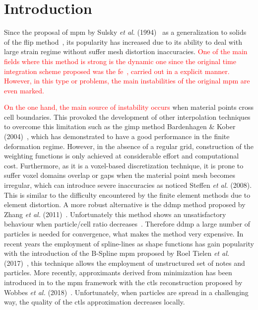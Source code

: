 \documentclass[preprint,12pt,a4paper]{elsarticle}
\newcommand{\PNA}[1]{
  \textcolor{red}{{#1}}
}
\begin{document}
\linenumbers

\section{Introduction}
\label{intro}
Since the proposal of \acrshort{mpm} by Sulsky {\it  et al.}
(1994)~\cite{Sulsky1994} as a generalization to solids of the \acrfull{flip} method~\cite{Brackbill1986}, its popularity
has increased due to its ability to deal with large strain regime
without suffer mesh distortion inaccuracies. \PNA{One of the main fields where this method is strong is the dynamic one since the original time integration scheme proposed was the \acrfull{fe}~\cite{Sulsky1994}, carried out in a explicit manner. However, in this type or problems, the main instabilities of the original \acrshort{mpm} are even marked.}

\PNA{On the one hand, the main source of instability occurs} when
material points cross cell boundaries. This provoked the development
of other interpolation techniques to overcome this limitation such as
the \acrfull{gimp} method Bardenhagen \& Kober (2004)~\cite{Bardenhagen2004}, which has
demonstrated to have a good performance in the finite deformation
regime. However, in the absence of a regular grid, construction of the
weighting functions is only achieved at considerable effort and
computational cost.  Furthermore, as it is a voxel-based
discretization technique, it is prone to suffer voxel domains overlap
or gaps when the material point mesh becomes irregular, which can
introduce severe inaccuracies as noticed Steffen {\it et al.}
(2008)\cite{Steffen2008}. This is similar to the difficulty
encountered by the finite element methods due to element distortion.
A more robust alternative is the \acrfull{ddmp} method proposed by Zhang {\it et al.}
(2011)~\cite{Zhang2011a}. Unfortunately this method shows an
unsatisfactory behaviour when particle/cell ratio
decreases~\cite{DHAKAL2016301}. Therefore \acrshort{ddmp} a large number of particles is needed for convergence, what
makes the method very expensive. In recent years the employment of
spline-lines as shape functions has gain popularity with the introduction of the B-Spline 
\acrshort{mpm} proposed by Roel Tielen {\it et al.} (2017)~\cite{TIELEN2017265},
this technique allows the employment of unstructured set of notes and
particles. More recently, approximants derived from minimization has
been introduced in to the \acrshort{mpm} framework with the \acrfull{ctls}
reconstruction proposed by Wobbes {\it et al.}
(2018)~\cite{E_Wobbes_2018}. Unfortunately, when particles are spread in
a challenging way, the quality of the \acrshort{ctls} approximation decreases locally.
\end{document}

